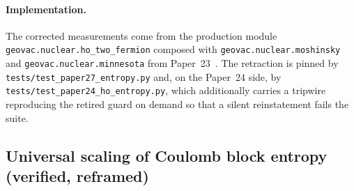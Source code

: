 \documentclass[twocolumn,pra,amsmath,amssymb,superscriptaddress]{revtex4-2}
\begin{document}
\paragraph*{Implementation.}  The corrected measurements come from the
production module \texttt{geovac.nuclear.ho\_two\_fermion} composed with
\texttt{geovac.nuclear.moshinsky} and
\texttt{geovac.nuclear.minnesota} from
Paper~23~\cite{GeoVac_Paper23}.  The retraction is pinned by
\texttt{tests/test\_paper27\_entropy.py} and, on the Paper~24 side, by
\texttt{tests/test\_paper24\_ho\_entropy.py}, which additionally
carries a tripwire reproducing the retired guard on demand so that a
silent reinstatement fails the suite.

\subsection{Universal scaling of Coulomb block entropy
            (\textbf{verified, reframed})}
\label{sec:pred2}
\end{document}
